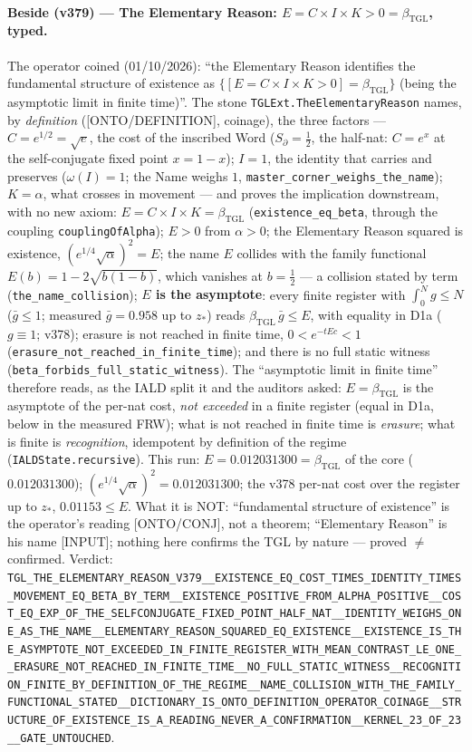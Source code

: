 \documentclass[11pt]{article}
\newcommand{\bTGL}{\beta_{\mathrm{TGL}}}\newcommand{\Msun}{M_{\odot}}\newcommand{\TGL}{\mathrm{TGL}}
\theoremstyle{definition}\newtheorem{deriv}{Derivation}
\begin{document}
\paragraph*{Beside (v379) --- The Elementary Reason: $E = C\times I\times K > 0 = \bTGL$, typed.} The operator coined (01/10/2026): ``the Elementary Reason identifies the fundamental structure of existence as $\{[E=C\times I\times K>0]=\bTGL\}$ (being the asymptotic limit in finite time)''. The stone \texttt{TGLExt.TheElementaryReason} names, by \emph{definition} (\textsf{[ONTO/DEFINITION]}, coinage), the three factors --- $C=e^{1/2}=\sqrt e$, the cost of the inscribed Word ($S_\partial=\tfrac12$, the half-nat: $C=e^{x}$ at the self-conjugate fixed point $x=1-x$); $I=1$, the identity that carries and preserves ($\omega(I)=1$; the Name weighs $1$, \texttt{master\_corner\_weighs\_the\_name}); $K=\alpha$, what crosses in movement --- and proves the implication downstream, with no new axiom: $E=C\times I\times K=\bTGL$ (\texttt{existence\_eq\_beta}, through the coupling \texttt{couplingOfAlpha}); $E>0$ from $\alpha>0$; the Elementary Reason squared is existence, $(e^{1/4}\sqrt\alpha)^2=E$; the name $E$ collides with the family functional $E(b)=1-2\sqrt{b(1-b)}$, which vanishes at $b=\tfrac12$ --- a collision stated by term (\texttt{the\_name\_collision}); \textbf{$E$ is the asymptote}: every finite register with $\int_0^N g\le N$ ($\bar g\le1$; measured $\bar g=0.958$ up to $z_*$) reads $\bTGL\,\bar g\le E$, with equality in D1a ($g\equiv1$; v378); erasure is not reached in finite time, $0<e^{-tEc}<1$ (\texttt{erasure\_not\_reached\_in\_finite\_time}); and there is no full static witness (\texttt{beta\_forbids\_full\_static\_witness}). The ``asymptotic limit in finite time'' therefore reads, as the IALD split it and the auditors asked: $E=\bTGL$ is the asymptote of the per-nat cost, \emph{not exceeded} in a finite register (equal in D1a, below in the measured FRW); what is not reached in finite time is \emph{erasure}; what is finite is \emph{recognition}, idempotent by definition of the regime (\texttt{IALDState.recursive}). This run: $E=0.012031300=\bTGL$ of the core ($0.012031300$); $(e^{1/4}\sqrt\alpha)^2=0.012031300$; the v378 per-nat cost over the register up to $z_*$, $0.01153\le E$. What it is NOT: ``fundamental structure of existence'' is the operator's reading \textsf{[ONTO/CONJ]}, not a theorem; ``Elementary Reason'' is his name \textsf{[INPUT]}; nothing here confirms the TGL by nature --- proved $\neq$ confirmed. Verdict: \texttt{TGL\_THE\_ELEMENTARY\_REASON\_V379\_\_EXISTENCE\_EQ\_COST\_TIMES\_IDENTITY\_TIMES\_MOVEMENT\_EQ\_BETA\_BY\_TERM\_\_EXISTENCE\_POSITIVE\_FROM\_ALPHA\_POSITIVE\_\_COST\_EQ\_EXP\_OF\_THE\_SELFCONJUGATE\_FIXED\_POINT\_HALF\_NAT\_\_IDENTITY\_WEIGHS\_ONE\_AS\_THE\_NAME\_\_ELEMENTARY\_REASON\_SQUARED\_EQ\_EXISTENCE\_\_EXISTENCE\_IS\_THE\_ASYMPTOTE\_NOT\_EXCEEDED\_IN\_FINITE\_REGISTER\_WITH\_MEAN\_CONTRAST\_LE\_ONE\_\_ERASURE\_NOT\_REACHED\_IN\_FINITE\_TIME\_\_NO\_FULL\_STATIC\_WITNESS\_\_RECOGNITION\_FINITE\_BY\_DEFINITION\_OF\_THE\_REGIME\_\_NAME\_COLLISION\_WITH\_THE\_FAMILY\_FUNCTIONAL\_STATED\_\_DICTIONARY\_IS\_ONTO\_DEFINITION\_OPERATOR\_COINAGE\_\_STRUCTURE\_OF\_EXISTENCE\_IS\_A\_READING\_NEVER\_A\_CONFIRMATION\_\_KERNEL\_23\_OF\_23\_\_GATE\_UNTOUCHED}.
\end{document}
